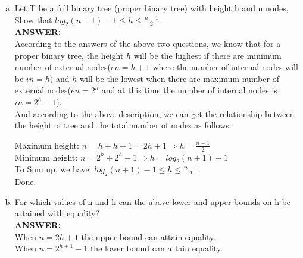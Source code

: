 \documentclass{article}
\newcommand{\answer}{\textbf{\\\underline{ANSWER:}\\}}
\begin{document}
\begin{enumerate}
\begin{enumerate}[(a)]
\item Let T be a full binary tree (proper binary tree) with height
  h and n nodes, Show that $log_2(n+1)-1 \leq h\leq \frac{n-1}{2}$. 
  \answer According to the answers of the above two questions, we know
  that for a proper binary tree, the height $h$ will be the highest if
  there are minimum number of external nodes($en=h+1$ where the
  number of internal nodes will be $in=h$) and $h$ will be the
  lowest when there are maximum number of external nodes($en=2^h$ and
  at this time the number of internal nodes is $in=2^h-1$). \\
  And according to the above description, we can get the relationship
  between the height of tree and the total number of nodes as follows:
  
  Maximum height: $n=h+h+1=2h+1 \Rightarrow h = \frac{n-1}{2}$ \\
  Minimum height: $n=2^h+2^h-1 \Rightarrow h=log_2(n+1)-1$ \\
  To Sum up, we have: $log_2(n+1)-1\leq h \leq \frac{n-1}{2}$.\\ 
  Done. \\

\item For which values of n and h can the above lower and upper
  bounds on h be attained with equality?
\answer When $n=2h+1$ the upper bound can attain equality. \\
When $n=2^{h+1}-1$ the lower bound can attain equality. 
\end{enumerate}


\end{enumerate}
\end{document}
